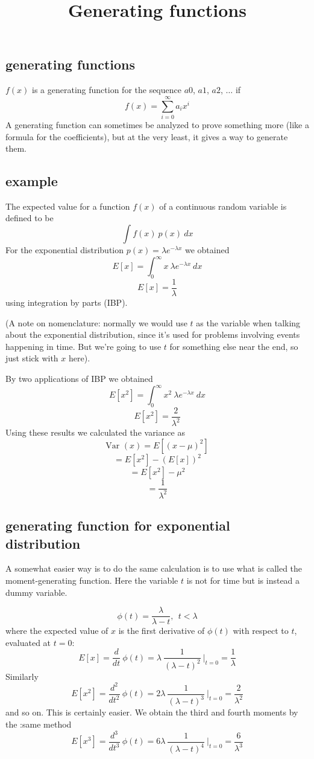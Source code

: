 \documentclass[11pt, oneside]{article}
\title{Generating functions}
\date{}
\begin{document}
\maketitle
\Large
\subsection*{generating functions}

$f(x)$ is a generating function for the sequence $a0$, $a1$, $a2$, $\dots$ if
\[ f(x) = \sum_{i = 0}^{\infty} a_i x^i \]
A generating function can sometimes be analyzed to prove something more (like a formula for the coefficients), but at the very least, it gives a way to generate them.

\subsection*{example}

The expected value for a function $f(x)$ of a continuous random variable is defined to be
\[ \int f(x) \ p(x) \ dx \]
For the exponential distribution $p(x) = \lambda e^{-\lambda x}$ we obtained
\[ E[x] = \int_0^{\infty} x \  \lambda e^{-\lambda x} \ dx \]
\[ E[x] = \frac{1}{\lambda} \]
using integration by parts (IBP).

(A note on nomenclature:  normally we would use $t$ as the variable when talking about the exponential distribution, since it's used for problems involving events happening in time.  But we're going to use $t$ for something else near the end, so just stick with $x$ here).

By two applications of IBP we obtained
\[ E[x^2] = \int_0^{\infty} x^2 \  \lambda e^{-\lambda x} \ dx \]
\[ E[x^2] = \frac{2}{\lambda^2} \]
Using these results we calculated the variance as
\[ \text{Var }(x) = E [(x - \mu)^2 ] \]
\[ = E[x^2] - (E[x])^2 \]
\[ = E[x^2] - \mu^2 \]
\[ = \frac{1}{\lambda^2} \]

\subsection*{generating function for exponential distribution}
A somewhat easier way is to do the same calculation is to use what is called the moment-generating function.  Here the variable $t$ is not for time but is instead a dummy variable.

\[ \phi(t) = \frac{\lambda}{\lambda - t}, \ \ t < \lambda \]
where the expected value of $x$ is the first derivative of $\phi(t)$ with respect to $t$, evaluated at $t=0$:
\[ E[x] = \frac{d}{dt} \ \phi(t) = \lambda \ \frac{1}{(\lambda - t)^2} \ \bigg |_{t=0} = \frac{1}{\lambda} \]
Similarly
\[ E[x^2] = \frac{d^2}{dt^2} \ \phi(t) = 2 \lambda \ \frac{1}{(\lambda - t)^3} \ \bigg |_{t=0}  = \frac{2}{\lambda^2}  \]
and so on.
This is certainly easier.  We obtain the third and fourth moments by the :same method
\[ E[x^3] = \frac{d^3}{dt^3} \ \phi(t) = 6 \lambda \ \frac{1}{(\lambda - t)^4} \ \bigg |_{t=0}  = \frac{6}{\lambda^3}  \]
\end{document}
